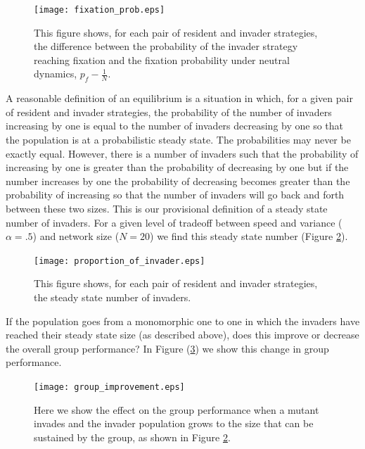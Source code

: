 \documentclass{article}
\begin{document}
 \begin{figure}
\begin{center}
\texttt{[image: fixation\_prob.eps]}
\end{center}
\caption{ \label{fixation_prob} This figure shows, for each pair of resident and invader strategies, the difference between the probability of the invader strategy reaching fixation and the fixation probability under neutral dynamics, $p_f-\frac{1}{N}$.  }
\end{figure}
 
 
A reasonable definition of an equilibrium is a situation in which, for a given pair of resident and invader strategies, the probability of the number of invaders increasing by one is equal to the number of invaders decreasing by one so that the population is at a probabilistic steady state.  The probabilities may never be exactly equal.  However, there is a number of invaders such that the probability of increasing by one is greater than the probability of decreasing by one but if the number increases by one the probability of decreasing becomes greater than the probability of increasing so that the number of invaders will go back and forth between these two sizes.  This is our provisional definition of a steady state number of invaders.  For a given level of tradeoff between speed and variance ($\alpha=.5$) and network size ($N=20$) we find this steady state number (Figure \ref{prop_of_invaders}).

\begin{figure}
\begin{center}
\texttt{[image: proportion\_of\_invader.eps]}
\end{center}
\caption{ \label{prop_of_invaders} This figure shows, for each pair of resident and invader strategies, the steady state number of invaders.  }
\end{figure}

If the population goes from a monomorphic one to one in which the invaders have reached their steady state size (as described above), does this improve or decrease the overall group performance?  In Figure (\ref{group_improvement}) we show this change in group performance.  

\begin{figure}
\begin{center}
\texttt{[image: group\_improvement.eps]}
\end{center}
\caption{ \label{group_improvement} Here we show the effect on the group performance when a mutant invades and the invader population grows to the size that can be sustained by the group, as shown in Figure \ref{prop_of_invaders}.}
\end{figure}
\end{document}
